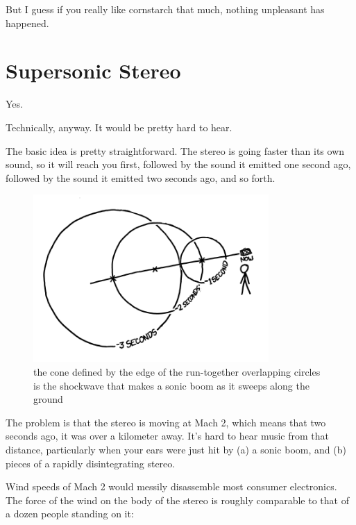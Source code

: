 {But I guess if you really like cornstarch that much, nothing unpleasant has happened.}

{
\chapter{Supersonic Stereo}
}

\hfill{}

{Yes.}

{Technically, anyway. It would be pretty hard to hear.}

{The basic idea is pretty straightforward. The stereo is going faster than its own sound, so it will reach you first, followed by the sound it emitted one second ago, followed by the sound it emitted two seconds ago, and so forth.}

\begin{figure}[!htbp]
\centering
\includegraphics[scale=0.5, max width=0.8\textwidth]{imgs/a/37/stereo_waves.png}
\caption{the cone defined by the edge of the run-together overlapping circles is the shockwave that makes a sonic boom as it sweeps along the ground}
\end{figure}

{The problem is that the stereo is moving at Mach 2, which means that two seconds ago, it was over a kilometer away. It’s hard to hear music from that distance, particularly when your ears were just hit by (a) a sonic boom, and (b) pieces of a rapidly disintegrating stereo.}

{Wind speeds of Mach 2 would messily disassemble most consumer electronics. The force of the wind on the body of the stereo is roughly comparable to that of a dozen people standing on it:}

